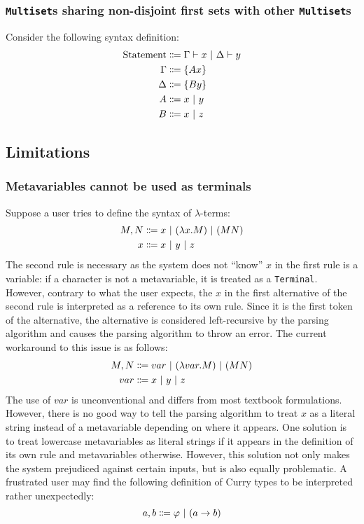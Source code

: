 \subsubsection{\texorpdfstring{\lstinline{Multiset}}{Multiset}s sharing non-disjoint first sets with other \texorpdfstring{\lstinline{Multiset}}{Multiset}s}
Consider the following syntax definition:
\begin{align*}
    \text{Statement} &\Coloneqq \Gamma \vdash x \ |\  \Delta \vdash y \\
    \Gamma &\Coloneqq \{ Ax \} \\
    \Delta &\Coloneqq \{ By \} \\
    A &\Coloneqq x \ |\  y \\
    B &\Coloneqq x \ |\  z
\end{align*}

\subsection{Limitations}
\subsubsection{Metavariables cannot be used as terminals}
Suppose a user tries to define the syntax of $\lambda$-terms:
\begin{align*}
    M, N &\Coloneqq x \ |\  (\lambda x. M) \ |\  (MN) \\
    x &\Coloneqq x \ |\  y \ |\  z
\end{align*}
The second rule is necessary as the system does not ``know'' $x$ in the first rule is a variable: if a character is not a metavariable, it is treated as a \lstinline{Terminal}. However, contrary to what the user expects, the $x$ in the first alternative of the second rule is interpreted as a reference to its own rule. Since it is the first token of the alternative, the alternative is considered left-recursive by the parsing algorithm and causes the parsing algorithm to throw an error. The current workaround to this issue is as follows:
\begin{align*}
    M, N &\Coloneqq var \ |\  (\lambda var. M) \ |\  (MN) \\
    var &\Coloneqq x \ |\  y \ |\  z
\end{align*}
The use of $var$ is unconventional and differs from most textbook formulations. However, there is no good way to tell the parsing algorithm to treat $x$ as a literal string instead of a metavariable depending on where it appears. One solution is to treat lowercase metavariables as literal strings if it appears in the definition of its own rule and metavariables otherwise. However, this solution not only makes the system prejudiced against certain inputs, but is also equally problematic. A frustrated user may find the following definition of Curry types to be interpreted rather unexpectedly:
\[
  a, b \Coloneqq \varphi \ |\  (a \to b)
\]